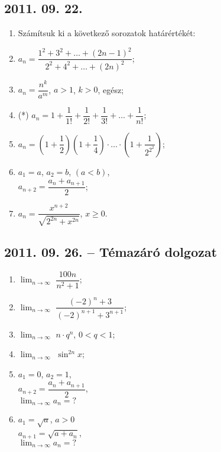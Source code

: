 \documentclass{article}
\begin{document}
\subsection*{2011. 09. 22.}
\begin{enumerate}
\item Számítsuk ki a következő sorozatok határértékét:
	\item $a_n=\dfrac{1^2+3^2+\ldots+(2n-1)^2}{2^2+4^2+\ldots+(2n)^2}$;
    \item $a_n=\dfrac{n^k}{a^m}$, $a>1$, $k>0$, egész;
    \item (*) $a_n=1+\dfrac{1}{1!}+\dfrac{1}{2!}+\dfrac{1}{3!}+\ldots+\dfrac{1}{n!}$;
    \item $a_n=\left(1+\dfrac{1}{2}\right)\left(1+\dfrac{1}{4}\right)\cdot\ldots\cdot\left(1+\dfrac{1}{2^{2^2}}\right)$;
    \item $a_1=a$, $a_2=b$, $(a<b)$,\\ $a_{n+2}=\dfrac{a_n+a_{n+1}}{2}$;
    \item $a_n=\dfrac{x^{n+2}}{\sqrt{2^{2n}+x^{2n}}}$, $x\ge 0$.
\end{enumerate}

\subsection*{2011. 09. 26. -- Témazáró dolgozat}
\begin{enumerate}
	\item $\displaystyle\lim_{n \to \infty}$ $\dfrac{100n}{n^2+1}$;
	\item $\displaystyle\lim_{n \to \infty}$ $\dfrac{(-2)^n+3}{(-2)^{n+1}+3^{n+1}}$;
    \item $\displaystyle\lim_{n \to \infty}$ $n\cdot q^n$, $0<q<1$;
	\item $\displaystyle\lim_{n \to \infty}$ $\sin^{2n}x$;
    \item $a_1=0$, $a_2=1$, \\ $a_{n+2}=\dfrac{a_n+a_{n+1}}{2}$, \\ $\displaystyle\lim_{n \to \infty} a_n=?$
    \item $a_1=\sqrt{a}$, $a>0$\\ $a_{n+1}=\sqrt{a+a_n}$, \\ $\displaystyle\lim_{n \to \infty} a_n=?$





\end{enumerate}
\end{document}
